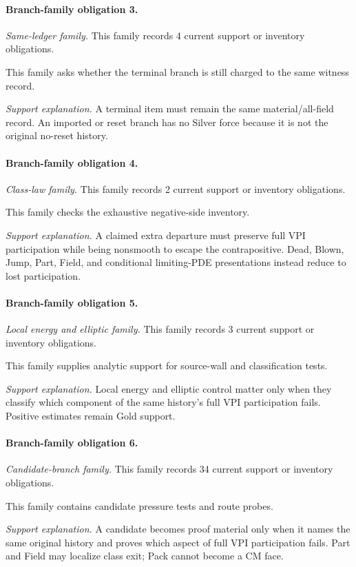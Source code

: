 \paragraph{Branch-family obligation 3.}
\emph{Same-ledger family.} This family records 4 current support or inventory obligations.

This family asks whether the terminal branch is still charged to the same witness record.

\emph{Support explanation.} A terminal item must remain the same material/all-field record. An imported or reset branch has no Silver force because it is not the original no-reset history.

\paragraph{Branch-family obligation 4.}
\emph{Class-law family.} This family records 2 current support or inventory obligations.

This family checks the exhaustive negative-side inventory.

\emph{Support explanation.} A claimed extra departure must preserve full VPI participation while being nonsmooth to escape the contrapositive. Dead, Blown, Jump, Part, Field, and conditional limiting-PDE presentations instead reduce to lost participation.

\paragraph{Branch-family obligation 5.}
\emph{Local energy and elliptic family.} This family records 3 current support or inventory obligations.

This family supplies analytic support for source-wall and classification tests.

\emph{Support explanation.} Local energy and elliptic control matter only when they classify which component of the same history's full VPI participation fails. Positive estimates remain Gold support.

\paragraph{Branch-family obligation 6.}
\emph{Candidate-branch family.} This family records 34 current support or inventory obligations.

This family contains candidate pressure tests and route probes.

\emph{Support explanation.} A candidate becomes proof material only when it names the same original history and proves which aspect of full VPI participation fails. Part and Field may localize class exit; Pack cannot become a CM face.
